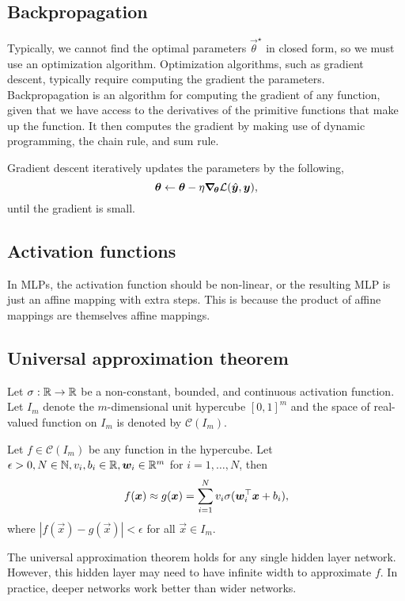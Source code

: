 \subsection{Backpropagation}

Typically, we cannot find the optimal parameters $\vec{\theta}^\star$ in closed form, so we must
use an optimization algorithm. Optimization algorithms, such as gradient descent, typically require
computing the gradient \wrt the parameters. Backpropagation is an algorithm for computing the
gradient of any function, given that we have access to the derivatives of the primitive functions
that make up the function. It then computes the gradient by making use of
dynamic programming, the chain rule, and sum rule.

Gradient descent iteratively updates the parameters by the following, \[
    \bm{\theta} \gets \bm{\theta} - \eta \bm{\nabla}_{\! \bm{\theta}} \mathcal{L}(\hat{\bm{y}},\bm{y}),
\]
until the gradient is small.

\subsection{Activation functions}

In MLPs, the activation function should be non-linear, or the resulting MLP is just an affine mapping
with extra steps. This is because the product of affine mappings are themselves affine mappings.

\subsection{Universal approximation theorem}

\begin{theorem}
    Let $\sigma: \mathbb{R}\to \mathbb{R}$ be a non-constant, bounded, and continuous activation function.
    Let $I_m$ denote the $m$-dimensional unit hypercube $[0,1]^m$ and the space of real-valued
    function on $I_m$ is denoted by $\mathcal{C}(I_m)$.

    Let $f \in \mathcal{C}(I_m)$ be any function in the hypercube. Let
    $\epsilon > 0, N\in \mathbb{N}, v_i,b_i \in \mathbb{R}, \bm{w}_i \in \mathbb{R}^m$ for $i=1,\ldots,N$, then \[
        f(\bm{x}) \approx g(\bm{x}) = \sum_{i=1}^{N} v_i \sigma(\bm{w}_i^\top \bm{x} + b_i),
    \]
    where $|f(\vec{x}) - g(\vec{x})| < \epsilon$ for all $\vec{x}\in I_m$.
\end{theorem}

The universal approximation theorem holds for any single hidden layer network. However, this hidden layer
may need to have infinite width to approximate $f$. In practice, deeper networks work better than wider
networks.
